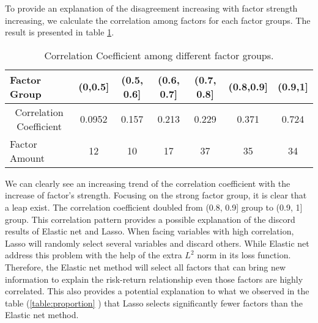 To provide an explanation of the disagreement increasing with factor strength increasing, we calculate the correlation among factors for each factor groups.
The result is presented in table \ref{table:Correlation}.
\begin{table}[h]
	\centering
	\caption{Correlation Coefficient among different factor groups. }
	\label{table:Correlation}
	\begin{tabular}{l|cccccc}
		\hline
		\hline
		Factor Group                                 & (0,0.5{]} & (0.5, 0.6{]} & (0.6, 0.7{]} & (0.7, 0.8{]} & (0.8,0.9{]} & (0.9,1{]} \\ \hline
		\multicolumn{1}{c|}{Correlation Coefficient} & 0.0952    & 0.157        & 0.213        & 0.229        & 0.371       & 0.724   \\
		Factor Amount &12 & 10 &  17 & 37& 35 &34  \\ \hline \hline
	\end{tabular}
\end{table}
We can clearly see an increasing trend of the correlation coefficient with the increase of factor's strength.
Focusing on the strong factor group, it is clear that a leap exist.
The correlation coefficient doubled from (0.8, 0.9] group to (0.9, 1] group.
This correlation pattern provides a possible explanation of the discord results of Elastic net and Lasso.
When facing variables with high correlation, Lasso will randomly select several variables and discard others.
While Elastic net address this problem with the help of the extra $L^2$ norm in its loss function.
Therefore, the Elastic net method will select all factors that can bring new information to explain the risk-return relationship even those factors are highly correlated.
This also provides a potential explanation to what we observed in the table (\ref{table:proportion} ) that Lasso selects significantly fewer factors than the Elastic net method.
